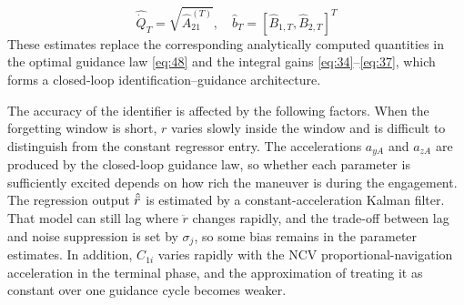 \begin{equation}
\label{eq:66}
\hat{\dot Q}_{T} = \sqrt {\hat A_{21}^{(T)}} ,\quad \hat{b}_{T} = {\left[ {{{\hat B}_{1,T}},{{\hat B}_{2,T}}} \right]^T}
\end{equation}
These estimates replace the corresponding analytically computed quantities in the optimal guidance law \eqref{eq:48} and the integral gains \eqref{eq:34}--\eqref{eq:37}, which forms a closed-loop identification--guidance architecture.
\begin{remark}
The accuracy of the identifier is affected by the following factors. When the forgetting window is short, $r$ varies slowly inside the window and is difficult to distinguish from the constant regressor entry. The accelerations ${a_{yA}}$ and ${a_{zA}}$ are produced by the closed-loop guidance law, so whether each parameter is sufficiently excited depends on how rich the maneuver is during the engagement. The regression output $\hat{\ddot{r}}$ is estimated by a constant-acceleration Kalman filter. That model can still lag where $\ddot r$ changes rapidly, and the trade-off between lag and noise suppression is set by ${\sigma _j}$, so some bias remains in the parameter estimates. In addition, ${C_{1i}}$ varies rapidly with the NCV proportional-navigation acceleration in the terminal phase, and the approximation of treating it as constant over one guidance cycle becomes weaker.
\end{remark}

